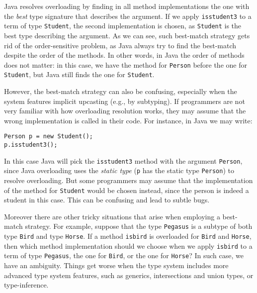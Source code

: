 \noindent Java resolves overloading by finding in all method implementations the one with
the \textit{best} type signature that describes the argument. If we
apply \lstinline{isstudent3} to a term of type \lstinline{Student}, the second
implementation is chosen, as \lstinline{Student} is the best type describing the
argument. As we can see, such best-match strategy gets rid of the
order-sensitive problem, as Java always try to find the best-match despite
the order of the methods. In other words, in Java the order of methods does not matter:
in this case,
we have the method for \lstinline{Person} before the one for \lstinline{Student}, but Java still finds
the one for \lstinline{Student}.

However, the best-match strategy can also be confusing, especially when the
system features implicit upcasting (e.g., by subtyping). If programmers
are not very familiar with how overloading resolution works, they may assume
that the wrong implementation is called in their code. For instance, in Java
we may write:

\begin{lstlisting}
Person p = new Student();
p.isstudent3();
\end{lstlisting}

\noindent In this case Java will pick the \lstinline{isstudent3} method with the
argument \lstinline{Person}, since Java overloading uses the \emph{static type}
(\lstinline{p} has the static type \lstinline{Person})
to resolve overloading. But some programmers may assume that the implementation
of the method for \lstinline{Student} would be chosen instead, since the person
is indeed a student in this case. This can be confusing and lead to subtle bugs.

Moreover there are other tricky situations
that arise when employing a best-match strategy. For example, suppose
that the type \lstinline{Pegasus} is a subtype of both type \lstinline{Bird} and type
\lstinline{Horse}. If a method \lstinline{isbird} is overloaded for
\lstinline{Bird} and \lstinline{Horse}, then which method implementation should
we choose when we apply \lstinline{isbird} to a term of type
\lstinline{Pegasus}, the one for \lstinline{Bird}, or the one for
\lstinline{Horse}? In such case, we have an ambiguity. Things get worse
when the type system includes more advanced type system features, such as generics,
intersections and union types,
or type-inference.




